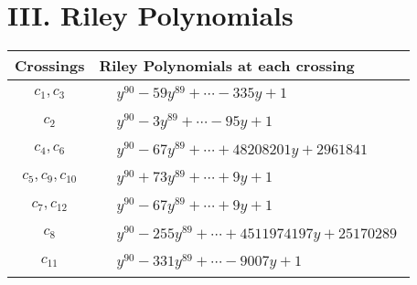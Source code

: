 \documentclass[1p]{elsarticle_modified}
\theoremstyle{definition}
\begin{document}
\centering \section*{ III. Riley Polynomials}
\begin{tabular}{m{50pt}|m{274pt}}
Crossings & \hspace{64pt}Riley Polynomials at each crossing \\
\hline $$\begin{aligned}c_{1},c_{3}\end{aligned}$$&$\begin{aligned}
&y^{90}-59 y^{89}+\cdots-335 y+1
\end{aligned}$\\
\hline $$\begin{aligned}c_{2}\end{aligned}$$&$\begin{aligned}
&y^{90}-3 y^{89}+\cdots-95 y+1
\end{aligned}$\\
\hline $$\begin{aligned}c_{4},c_{6}\end{aligned}$$&$\begin{aligned}
&y^{90}-67 y^{89}+\cdots+48208201 y+2961841
\end{aligned}$\\
\hline $$\begin{aligned}c_{5},c_{9},c_{10}\end{aligned}$$&$\begin{aligned}
&y^{90}+73 y^{89}+\cdots+9 y+1
\end{aligned}$\\
\hline $$\begin{aligned}c_{7},c_{12}\end{aligned}$$&$\begin{aligned}
&y^{90}-67 y^{89}+\cdots+9 y+1
\end{aligned}$\\
\hline $$\begin{aligned}c_{8}\end{aligned}$$&$\begin{aligned}
&y^{90}-255 y^{89}+\cdots+4511974197 y+25170289
\end{aligned}$\\
\hline $$\begin{aligned}c_{11}\end{aligned}$$&$\begin{aligned}
&y^{90}-331 y^{89}+\cdots-9007 y+1
\end{aligned}$\\
\hline
\end{tabular}
\vskip 2pc
\end{document}

